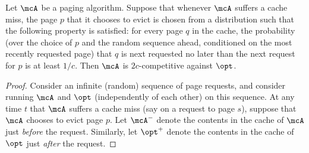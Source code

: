 \documentclass[11pt]{article}
\begin{document}
\begin{lemma}
    \label{lem:lpr}
    Let $\mcA$ be a paging algorithm. Suppose that whenever $\mcA$ suffers a cache miss, the page $p$ that it chooses to evict is chosen from a distribution such that the following property is satisfied: for every page $q$ in the cache, the probability (over the choice of $p$ and the random sequence ahead, conditioned on the most recently requested page) that $q$ is next requested no later than the next request for $p$ is at least $1/c$. Then $\mcA$ is $2c$-competitive against $\opt$.
\end{lemma}
\begin{proof}
    Consider an infinite (random) sequence of page requests, and consider running $\mcA$ and $\opt$ (independently of each other) on this sequence. At any time $t$ that $\mcA$ suffers a cache miss (say on a request to page $s$), suppose that $\mcA$ chooses to evict page $p$. Let $\mcA^-$ denote the contents in the cache of $\mcA$ just \textit{before} the request. Similarly, let $\opt^+$ denote the contents in the cache of $\opt$ just \textit{after} the request.
    

\end{proof}
\end{document}
